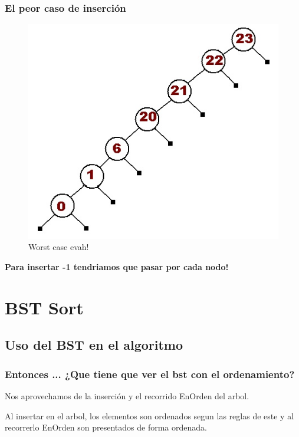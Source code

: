 \documentclass{beamer}
\begin{document}
\begin{frame}
\frametitle{El peor caso de inserción}
	\begin{figure}
  		\centering
    		\includegraphics[scale=0.3]{lls.jpg}
  		\caption{Worst case evah!}
  		\label{fig:lls}
	\end{figure}
	\begin{center}
		\textbf{Para insertar -1 tendriamos que pasar por cada nodo!}
	\end{center}
\end{frame}

\section{BST Sort}

\subsection{Uso del BST en el algoritmo}
\begin{frame}
\frametitle{Entonces ... ¿Que tiene que ver el bst con el ordenamiento?}
Nos aprovechamos de la inserción y el recorrido EnOrden del arbol.
\newline

Al insertar en el arbol, los elementos son ordenados segun las reglas de este y al recorrerlo EnOrden son presentados de forma ordenada.
\end{frame}

\end{document}
